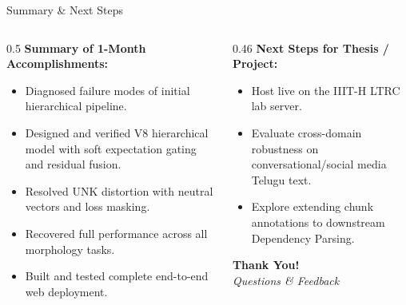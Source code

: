 \documentclass[aspectratio=169, 10pt]{beamer}
\begin{document}
\begin{frame}{Summary \& Next Steps}
  \begin{columns}[T]
    \begin{column}{0.5\textwidth}
      \textbf{Summary of 1-Month Accomplishments:}
      \begin{itemize}
        \item Diagnosed failure modes of initial hierarchical pipeline.
        \item Designed and verified V8 hierarchical model with soft expectation gating and residual fusion.
        \item Resolved UNK distortion with neutral vectors and loss masking.
        \item Recovered full performance across all morphology tasks.
        \item Built and tested complete end-to-end web deployment.
      \end{itemize}
    \end{column}

    \begin{column}{0.46\textwidth}
      \textbf{Next Steps for Thesis / Project:}
      \begin{itemize}
        \item Host live on the IIIT-H LTRC lab server.
        \item Evaluate cross-domain robustness on conversational/social media Telugu text.
        \item Explore extending chunk annotations to downstream Dependency Parsing.
      \end{itemize}
      \vspace{0.6cm}
      \begin{center}
        \Large \textbf{Thank You!} \\
        \vspace{0.2cm}
        \normalsize \textit{Questions \& Feedback}
      \end{center}
    \end{column}
  \end{columns}
\end{frame}
\end{document}

